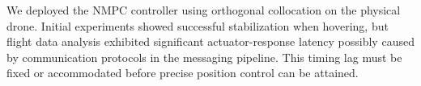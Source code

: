 \documentclass[conf]{new-aiaa}
\begin{document}
We deployed the NMPC controller using orthogonal collocation on the physical drone. Initial experiments showed successful stabilization when hovering, but flight data analysis exhibited significant actuator-response latency possibly caused by communication protocols in the messaging pipeline. This timing lag must be fixed or accommodated before precise position control can be attained.



\end{document}
